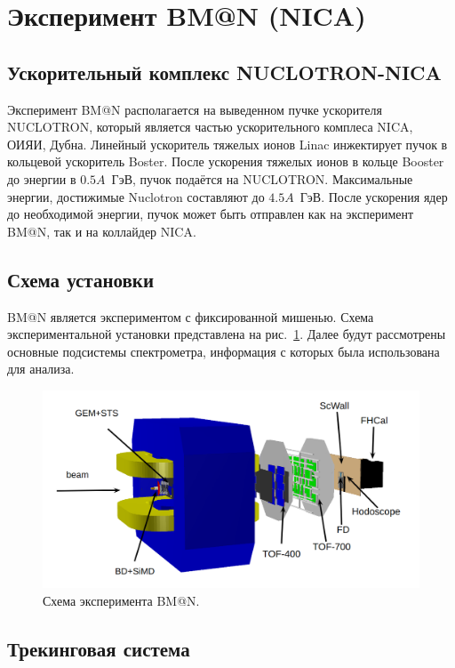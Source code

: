 
\section{Эксперимент BM@N (NICA)}

\subsection{Ускорительный комплекс NUCLOTRON-NICA}

Эксперимент BM@N располагается на выведенном пучке ускорителя NUCLOTRON, который является частью ускорительного комплеса NICA, ОИЯИ, Дубна.
Линейный ускоритель тяжелых ионов Linac инжектирует пучок в кольцевой ускоритель Boster.
После ускорения тяжелых ионов в кольце Booster до энергии в $0.5A$~ГэВ, пучок подаётся на NUCLOTRON.
Максимальные энергии, достижимые Nuclotron составляют до $4.5A$~ГэВ.
После ускорения ядер до необходимой энергии, пучок может быть отправлен как на эксперимент BM@N, так и на коллайдер NICA.

\subsection{Схема установки}

BM@N является экспериментом с фиксированной мишенью.
Схема экспериментальной установки представлена на рис.~\ref{fig:bmn_layout}.
Далее будут рассмотрены основные подсистемы спектрометра, информация с которых была использована для анализа.
%
\begin{figure}[ht]
\begin{center}
\includegraphics[width=0.95\linewidth]{images/BM@N_layout.png}
\caption{Схема эксперимента BM@N.}
\label{fig:bmn_layout}
\end{center}
\end{figure}

\subsection{Трекинговая система}

